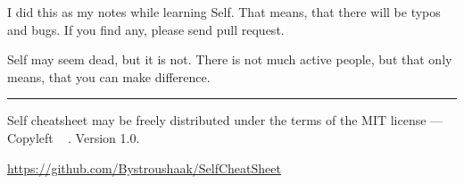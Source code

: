 \documentclass[10pt]{article}
\begin{document}
\begin{multicols*}{3}
I did this as my notes while learning Self. That means, that there will be typos and bugs. If you find any, please send pull request.

Self may seem dead, but it is not. There is not much active people, but that only means, that you can make difference.




\vspace*{0.4cm}
\hrule
\smallskip
{\small
Self cheatsheet may be freely distributed under
the terms of the MIT license ---
Copyleft \textcopyleft\ \thedate{} \href{http://kitakitsune.org}{\theauthor}. Version 1.0.

\url{https://github.com/Bystroushaak/SelfCheatSheet}
}

\end{multicols*}
\end{document}
